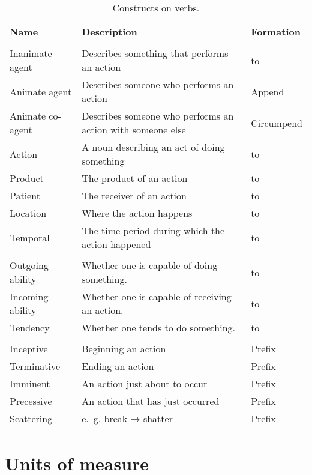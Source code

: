 \documentclass{book}
\begin{document}
\begin{longtabu}[c]{|l|X|l|}
  \caption{Constructs on verbs.} \\
  \hline
  Name & Description & Formation \\ \hline
  \endhead
   & & \\
  Inanimate agent & Describes something that performs an action &  to  \\
  Animate agent & Describes someone who performs an action & Append  \\
  Animate co-agent & Describes someone who performs an action with someone else & Circumpend  \\
  Action & A noun describing an act of doing something &  to  \\
  Product & The product of an action &  to  \\
  Patient & The receiver of an action &  to  \\
  Location & Where the action happens &  to  \\
  Temporal & The time period during which the action happened &  to  \\ \hline
   & & \\
  Outgoing ability & Whether one is capable of doing something. &  to  \\
  Incoming ability & Whether one is capable of receiving an action. &  to  \\
  Tendency & Whether one tends to do something. &  to  \\ \hline
   & & \\
  Inceptive & Beginning an action & Prefix  \\
  Terminative & Ending an action & Prefix  \\
  Imminent & An action just about to occur & Prefix  \\
  Precessive & An action that has just occurred & Prefix  \\
  Scattering & e.~g. break → shatter & Prefix  \\
  \hline
\end{longtabu}

\chapter{Units of measure}
\end{document}
